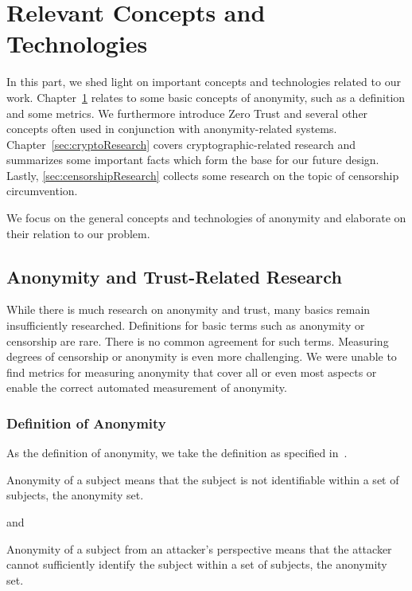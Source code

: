 
\part{Relevant Concepts and Technologies}\label{sec:concepts}
In this part, we shed light on important concepts and technologies related to our work. Chapter~\ref{sec:anontrustResearch} relates to some basic concepts of anonymity, such as a definition and some metrics. We furthermore introduce Zero Trust and several other concepts often used in conjunction with anonymity-related systems. Chapter~\ref{sec:cryptoResearch} covers cryptographic-related research and summarizes some important facts which form the base for our future design. Lastly, \cref{sec:censorshipResearch} collects some research on the topic of censorship circumvention.

We focus on the general concepts and technologies of anonymity and elaborate on their relation to our problem.

\chapter{Anonymity and Trust-Related Research}\label{sec:anontrustResearch}
While there is much research on anonymity and trust, many basics remain insufficiently researched. Definitions for basic terms such as anonymity or censorship are rare. There is no common agreement for such terms. Measuring degrees of censorship or anonymity is even more challenging. We were unable to find metrics for measuring anonymity that cover all or even most aspects or enable the correct automated measurement of anonymity.

\section{Definition of Anonymity}
As the definition of anonymity, we take the definition as specified in~\cite{anonTerminology}.
\begin{shadequote}{}
	Anonymity of a subject means that the subject is not identifiable within a set of subjects, the anonymity set.\omitted
\end{shadequote}
and
\begin{shadequote}{}
	Anonymity of a subject from an attacker's perspective means that the attacker cannot sufficiently identify the subject within a set of subjects, the anonymity set.\omitted
\end{shadequote}

